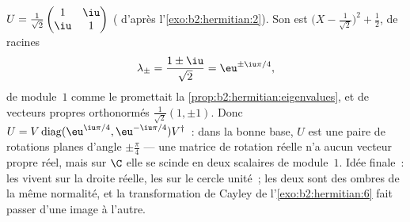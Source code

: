 \begin{example}\label{ex:b2:hermitian:unitary}
$U = \frac{1}{\sqrt2}\begin{pmatrix} 1 & \iu\\ \iu & 1
\end{pmatrix}$ ( d'après l'\cref{exo:b2:hermitian:2}). Son
 est $\bigl(X - \frac{1}{\sqrt2}\bigr)^2
+ \frac12$, de racines
\[
\lambda_\pm = \frac{1 \pm \iu}{\sqrt2} = \eu^{\pm\iu\pi/4},
\]
de module~$1$ comme le promettait la
\cref{prop:b2:hermitian:eigenvalues}, et de vecteurs propres
orthonormés $\frac{1}{\sqrt2}(1, \pm1)$. Donc $U =
V\operatorname{diag}(\eu^{\iu\pi/4},
\eu^{-\iu\pi/4})V^\dagger$~: dans la bonne base, $U$ est une paire de
rotations planes d'angle $\pm\frac\pi4$ --- une matrice de rotation
réelle n'a aucun vecteur propre réel, mais sur $\C$ elle se scinde en
deux scalaires de module~$1$. Idée finale~: les  
vivent sur la droite réelle, les   sur le cercle
unité~; les deux sont des ombres de la même normalité, et la
transformation de Cayley de l'\cref{exo:b2:hermitian:6} fait passer
d'une image à l'autre.
\end{example}

